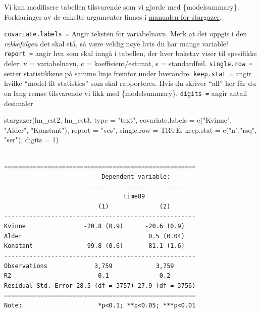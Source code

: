 \documentclass[
  letterpaper,
  DIV=11,
  numbers=noendperiod]{scrreprt}
\newenvironment{Shaded}{\begin{snugshade}}{\end{snugshade}}
\newcommand{\AttributeTok}[1]{\textcolor[rgb]{0.40,0.45,0.13}{#1}}
\newcommand{\ConstantTok}[1]{\textcolor[rgb]{0.56,0.35,0.01}{#1}}
\newcommand{\DecValTok}[1]{\textcolor[rgb]{0.68,0.00,0.00}{#1}}
\newcommand{\FunctionTok}[1]{\textcolor[rgb]{0.28,0.35,0.67}{#1}}
\newcommand{\NormalTok}[1]{\textcolor[rgb]{0.00,0.23,0.31}{#1}}
\newcommand{\StringTok}[1]{\textcolor[rgb]{0.13,0.47,0.30}{#1}}
\theoremstyle{definition}
\theoremstyle{remark}
\begin{document}
Vi kan modifisere tabellen tilsvarende som vi gjorde med
\{modelsummary\}. Forklaringer av de enkelte argumenter finnes i
\href{https://cran.r-project.org/web/packages/stargazer/stargazer.pdf}{manualen
for stargazer}.

\texttt{covariate.labels\ =} Angir teksten for variabelnavn. Merk at det
oppgis i den \emph{rekkefølgen} det skal stå, så være veldig nøye hvis
du har mange variable! \texttt{report\ =} angir hva som skal inngå i
tabellen, der hver bokstav viser til spesifikke deler: v = variabelnavn,
c = koeffisient/estimat, s = standardfeil. \texttt{single.row\ =} setter
statistikkene på samme linje fremfor under hverandre.
\texttt{keep.stat\ =} angir hvilke ``model fit statistics'' som skal
rapporteres. Hvis du skriver ``all'' her får du en lang remse
tilsvarende vi fikk med \{modelsummary\}. \texttt{digits\ =} angir
antall desimaler

\begin{Shaded}
\begin{Highlighting}[]
\FunctionTok{stargazer}\NormalTok{(lm\_est2, lm\_est3, }
          \AttributeTok{type =} \StringTok{"text"}\NormalTok{, }
          \AttributeTok{covariate.labels =} \FunctionTok{c}\NormalTok{(}\StringTok{"Kvinne"}\NormalTok{, }\StringTok{"Alder"}\NormalTok{, }\StringTok{"Konstant"}\NormalTok{),}
          \AttributeTok{report =} \StringTok{"vcs"}\NormalTok{,}
          \AttributeTok{single.row =} \ConstantTok{TRUE}\NormalTok{, }
          \AttributeTok{keep.stat =} \FunctionTok{c}\NormalTok{(}\StringTok{"n"}\NormalTok{,}\StringTok{"rsq"}\NormalTok{, }\StringTok{"ser"}\NormalTok{),}
          \AttributeTok{digits =} \DecValTok{1}\NormalTok{)}
\end{Highlighting}
\end{Shaded}

\begin{verbatim}

=====================================================
                           Dependent variable:       
                    ---------------------------------
                                 time89              
                          (1)              (2)       
-----------------------------------------------------
Kvinne                -20.8 (0.9)      -20.6 (0.9)   
Alder                                   0.5 (0.04)   
Konstant               99.8 (0.6)       81.1 (1.6)   
-----------------------------------------------------
Observations             3,759            3,759      
R2                        0.1              0.2       
Residual Std. Error 28.5 (df = 3757) 27.9 (df = 3756)
=====================================================
Note:                     *p<0.1; **p<0.05; ***p<0.01
\end{verbatim}
\end{document}
